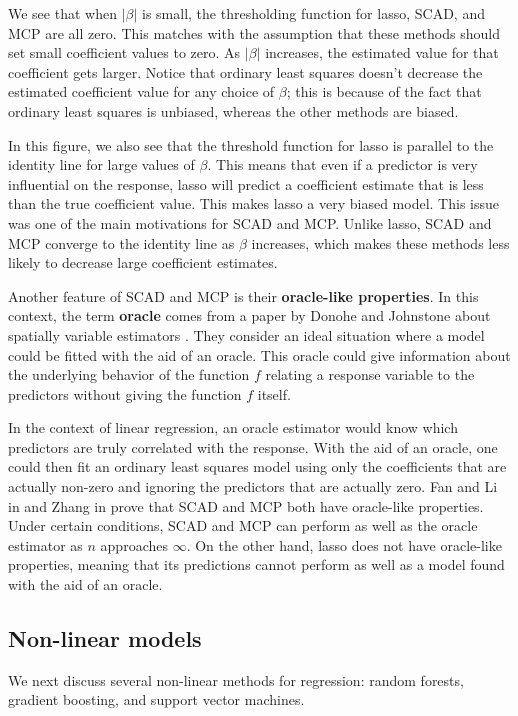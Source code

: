 \documentclass{article}
\begin{document}
We see that when $\vert \beta \vert$ is small, the thresholding function for lasso, SCAD, and MCP are all zero. This matches with the assumption that these methods should set small coefficient values to zero. As $\vert \beta \vert$ increases, the estimated value for that coefficient gets larger. Notice that ordinary least squares doesn't decrease the estimated coefficient value for any choice of $\beta$; this is because of the fact that ordinary least squares is unbiased, whereas the other methods are biased.

In this figure, we also see that the threshold function for lasso is parallel to the identity line for large values of $\beta$. This means that even if a predictor is very influential on the response, lasso will predict a coefficient estimate that is less than the true coefficient value. This makes lasso a very biased model. This issue was one of the main motivations for SCAD and MCP. Unlike lasso, SCAD and MCP converge to the identity line as $\beta$ increases, which makes these methods less likely to decrease large coefficient estimates.

Another feature of SCAD and MCP is their \textbf{oracle-like properties}. In this context, the term \textbf{oracle} comes from a paper by Donohe and Johnstone about spatially variable estimators \cite{donoho1994ideal}. They consider an ideal situation where a model could be fitted with the aid of an oracle. This oracle could give information about the underlying behavior of the function $f$ relating a response variable to the predictors without giving the function $f$ itself.

In the context of linear regression, an oracle estimator would know which predictors are truly correlated with the response. With the aid of an oracle, one could then fit an ordinary least squares model using only the coefficients that are actually non-zero and ignoring the predictors that are actually zero. Fan and Li in \cite{fan2001variable} and Zhang in \cite{zhang2010nearly} prove that SCAD and MCP both have oracle-like properties. Under certain conditions, SCAD and MCP can perform as well as the oracle estimator as $n$ approaches $\infty$. On the other hand, lasso does not have oracle-like properties, meaning that its predictions cannot perform as well as a model found with the aid of an oracle.

\subsection{Non-linear models}
We next discuss several non-linear methods for regression: random forests, gradient boosting, and support vector machines.
\end{document}
